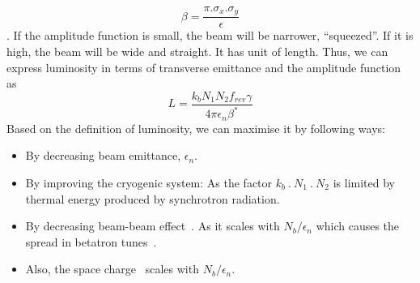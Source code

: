 \begin{equation}\label{eq:beta_function}
	\beta = \frac{\pi.\sigma_x.\sigma_y}{\epsilon}
\end{equation}. If the amplitude function is small, the beam will be narrower, ``squeezed''. If it is high, the beam will be wide and straight. It has unit of length. Thus, we can express luminosity in terms of transverse emittance and the amplitude function as
\begin{equation}\label{eq:luminosity2}
    L = \frac{k_bN_1N_2f_{rev}\gamma}{4 \pi \epsilon_n \beta^*}
\end{equation}
Based on the definition of luminosity, we can maximise it by following ways:
\begin{itemize}
    \item By decreasing beam emittance, $\epsilon_n$.
    \item By improving the cryogenic system: As the factor $k_b~.~N_1~.~N_2$ is limited by thermal energy produced by synchrotron radiation.
    \item By decreasing beam-beam effect~\cite{Herr2014,Papotti2014}. As it scales with $N_b/ \epsilon_n$ which causes the spread in betatron tunes~\cite{Dubouchet2013}.
    \item Also, the space charge~\cite{Oeftiger2016} scales with $N_b/ \epsilon_n$.
\end{itemize}

